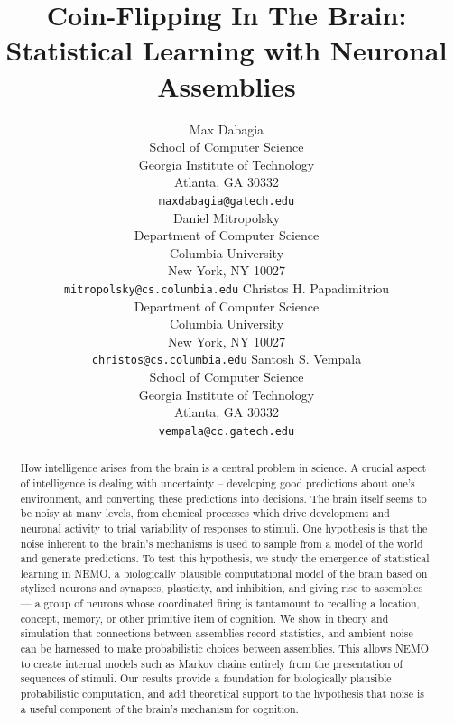 \documentclass{article}
\title{Coin-Flipping In The Brain: \\ Statistical Learning with Neuronal Assemblies}
\author{%
  Max Dabagia \\
  School of Computer Science\\
  Georgia Institute of Technology\\
  Atlanta, GA 30332 \\
  \texttt{maxdabagia@gatech.edu} \\
  \And
  Daniel Mitropolsky\\
  Department of Computer Science\\
  Columbia University\\
  New York, NY 10027\\
  \texttt{mitropolsky@cs.columbia.edu}
  \And
  Christos H. Papadimitriou\\
  Department of Computer Science\\
  Columbia University\\
  New York, NY 10027\\
  \texttt{christos@cs.columbia.edu}
  \And
  Santosh S. Vempala \\
  School of Computer Science\\
  Georgia Institute of Technology\\
  Atlanta, GA 30332 \\
  \texttt{vempala@cc.gatech.edu}
}
\theoremstyle{remark}
\newcommand{\1}{\mathbbm{1}}
\begin{document}
\maketitle


\begin{abstract}
How intelligence arises from the brain is a central problem in science. A crucial aspect of intelligence is dealing with uncertainty – developing good predictions about one’s environment, and converting these predictions into decisions. The brain itself seems to be noisy at many levels, from chemical
processes which drive development and neuronal activity to trial variability of responses to stimuli. One hypothesis is that the noise inherent to the brain’s mechanisms is used to sample from a model of the world and generate predictions. To test this hypothesis, we study the emergence of statistical learning in NEMO, a biologically plausible computational model of the brain based on stylized neurons and synapses, plasticity, and inhibition, and giving rise to
assemblies --- a group of neurons whose coordinated firing
is tantamount to recalling a location, concept, memory, or other primitive item of cognition. We show in theory and simulation that connections between assemblies record statistics, and ambient noise can be harnessed to make probabilistic choices between assemblies. This allows NEMO to create internal models such as Markov chains entirely from the presentation of sequences of stimuli. Our results provide a foundation for biologically plausible probabilistic computation, and add theoretical support to the hypothesis that noise is a useful component of the brain’s mechanism for cognition.
\end{abstract}
\end{document}
